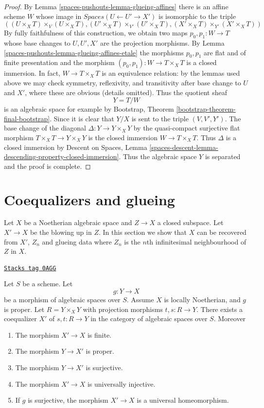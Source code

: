 \begin{proof}
\medskip\noindent
By Lemma \ref{spaces-pushouts-lemma-glueing-affines} there is an affine scheme $W$ whose
image in $\textit{Spaces}(U \leftarrow U' \to X')$ is isomorphic to
the triple
$$
((U \times_X T) \times_V (U \times_X T),
(U' \times_X T) \times_{V'} (U' \times_X T),
(X' \times_X T) \times_{Y'} (X' \times_X T))
$$
By fully faithfulness of this construction, we obtain
two maps $p_0, p_1 : W \to T$ whose base changes
to $U, U', X'$ are the projection morphisms.
By Lemma \ref{spaces-pushouts-lemma-glueing-affines-etale}
the morphisms $p_0, p_1$ are flat and of finite presentation and
the morphism $(p_0, p_1) : W \to T \times_X T$ is a closed immersion.
In fact, $W \to T \times_X T$ is an equivalence relation: by the lemmas
used above we may check symmetry, reflexivity, and transitivity
after base change to $U$ and $X'$, where these are obvious (details omitted).
Thus the quotient sheaf
$$
Y = T/W
$$
is an algebraic space for example by
Bootstrap, Theorem \ref{bootstrap-theorem-final-bootstrap}.
Since it is clear that $Y/X$ is sent to the triple $(V, V', Y')$.
The base change of the diagonal $\Delta : Y \to Y \times_X Y$
by the quasi-compact surjective flat morphism $T \times_X T \to Y \times_X Y$
is the closed immersion $W \to T \times_X T$. Thus $\Delta$
is a closed immersion by Descent on Spaces, Lemma
\ref{spaces-descent-lemma-descending-property-closed-immersion}.
Thus the algebraic space $Y$ is separated and the proof is complete.
\end{proof}

\section{Coequalizers and glueing}
\label{spaces-pushouts-section-coequalizer-glue}
Let $X$ be a Noetherian algebraic space and $Z \to X$ a closed subspace.
Let $X' \to X$ be the blowing up in $Z$. In this section we show that
$X$ can be recovered from $X'$, $Z_n$ and glueing data where $Z_n$
is the $n$th infinitesimal neighbourhood of $Z$ in $X$.

\begin{lemma}[Coequalizer]
\label{spaces-pushouts-lemma-coequalizer}
\href{https://stacks.math.columbia.edu/tag/0AGG}{\texttt{Stacks tag 0AGG}}

Let $S$ be a scheme. Let
$$
g : Y \longrightarrow X
$$
be a morphism of algebraic spaces over $S$. Assume $X$ is locally Noetherian,
and $g$ is proper. Let $R = Y \times_X Y$ with projection morphisms
$t, s : R \to Y$. There exists a coequalizer $X'$ of $s, t : R \to Y$
in the category of algebraic spaces over $S$. Moreover
\begin{enumerate}
\item The morphism $X' \to X$ is finite.
\item The morphism $Y \to X'$ is proper.
\item The morphism $Y \to X'$ is surjective.
\item The morphism $X' \to X$ is universally injective.
\item If $g$ is surjective, the morphism $X' \to X$
is a universal homeomorphism.
\end{enumerate}
\end{lemma}

